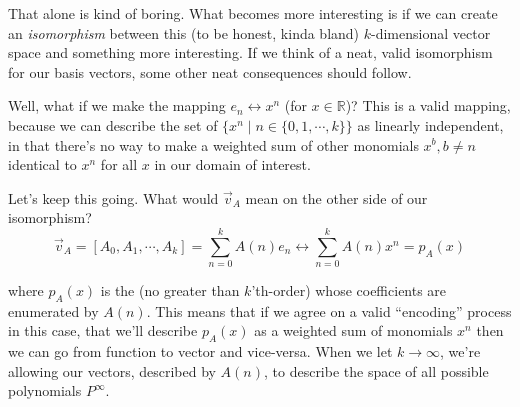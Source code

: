 \documentclass[letterpaper,12pt]{report}
\begin{document}
That alone is kind of boring. What becomes more interesting is if we can create an
\emph{isomorphism} between this
(to be honest, kinda bland) \(k\)-dimensional vector space and something
more interesting. If we think of a neat, valid isomorphism for our basis vectors,
some other neat consequences should follow. \par
Well, what if we make the mapping \(e_n \leftrightarrow x^n\) (for \(x \in \mathbb{R}\))?
This is a valid mapping, because we can describe the set of
\(\{x^n \mid n \in \{0, 1, \cdots, k\}\}\) as linearly independent, in that
there's no way to make a weighted sum of other monomials \(x^b, b\neq n\)
identical to \(x^n\) for all \(x\) in our domain of interest.\par
Let's keep this going. What would \(\vec{v}_A\) mean on the other side of our
isomorphism?
\[ \vec{v}_A = [A_0, A_1, \cdots, A_k] = \sum_{n=0}^{k}A(n) e_n
  \longleftrightarrow \sum_{n=0}^{k}A(n)x^n = p_A(x)  \]

where \(p_A(x)\) is the (no greater than \(k\)'th-order) whose coefficients
are enumerated by \(A(n)\). This means that if we agree on a valid ``encoding'' process
\textemdash{}
in this case, that we'll describe \(p_A(x)\) as a weighted sum of monomials \(x^n\)
\textemdash{}
then we can go from function to vector and vice-versa.
When we let \(k \rightarrow \infty\), we're allowing our vectors, described by \(A(n)\),
to describe the space of all possible polynomials \(P^\infty\).\par
\end{document}
